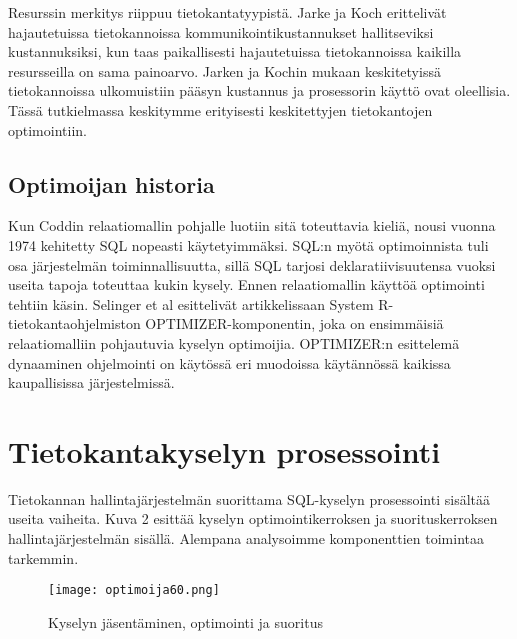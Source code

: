 \documentclass[finnish]{tktltiki2}
\theoremstyle{definition}
\theoremstyle{remark}
\begin{document}
Resurssin merkitys riippuu tietokantatyypistä. Jarke ja Koch erittelivät hajautetuissa tietokannoissa kommunikointikustannukset hallitseviksi kustannuksiksi, kun taas paikallisesti hajautetuissa tietokannoissa kaikilla resursseilla on sama painoarvo. Jarken ja Kochin mukaan keskitetyissä tietokannoissa ulkomuistiin pääsyn kustannus ja prosessorin käyttö ovat oleellisia. Tässä tutkielmassa keskitymme erityisesti keskitettyjen tietokantojen optimointiin.

\subsection{Optimoijan historia}
Kun Coddin relaatiomallin pohjalle luotiin sitä toteuttavia kieliä, nousi vuonna 1974 kehitetty SQL nopeasti käytetyimmäksi. SQL:n myötä optimoinnista tuli osa järjestelmän toiminnallisuutta, sillä SQL tarjosi deklaratiivisuutensa vuoksi useita tapoja toteuttaa kukin kysely. Ennen relaatiomallin käyttöä optimointi tehtiin käsin.
Selinger et al esittelivät artikkelissaan \cite{selinger1979access} System R-tietokantaohjelmiston OPTIMIZER-komponentin, joka on ensimmäisiä relaatiomalliin pohjautuvia kyselyn optimoijia. OPTIMIZER:n esittelemä dynaaminen ohjelmointi on käytössä eri muodoissa käytännössä kaikissa kaupallisissa järjestelmissä. \cite{ioannidis1996query}


\section{Tietokantakyselyn prosessointi}
Tietokannan hallintajärjestelmän suorittama SQL-kyselyn prosessointi sisältää useita vaiheita. Kuva 2 esittää kyselyn optimointikerroksen ja suorituskerroksen hallintajärjestelmän sisällä. Alempana analysoimme komponenttien toimintaa tarkemmin.

\begin{figure}[!h]
  \caption{Kyselyn jäsentäminen, optimointi ja suoritus}
  \centering
    \texttt{[image: optimoija60.png]}
\end{figure}
\end{document}
